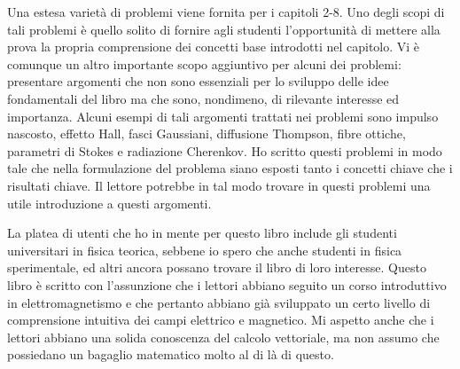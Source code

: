 Una estesa varietà di problemi viene fornita per i capitoli 2-8. Uno degli scopi di tali problemi è quello solito di fornire agli studenti l'opportunità di mettere alla prova la propria comprensione dei concetti base introdotti nel capitolo. Vi è comunque un altro importante scopo aggiuntivo per alcuni dei problemi: presentare argomenti che non sono essenziali per lo sviluppo delle idee fondamentali del libro ma che sono, nondimeno, di rilevante interesse ed importanza. Alcuni esempi di tali argomenti trattati nei problemi sono impulso nascosto, effetto Hall, fasci Gaussiani, diffusione Thompson, fibre ottiche, parametri di Stokes e radiazione Cherenkov. Ho scritto questi problemi in modo tale che nella formulazione del problema siano esposti tanto i concetti chiave che i risultati chiave. Il lettore potrebbe in tal modo trovare in questi problemi una utile introduzione a questi argomenti.

La platea di utenti che ho in mente per questo libro include gli studenti universitari in fisica teorica, sebbene io spero che anche studenti in fisica sperimentale, ed altri ancora possano trovare il libro di loro interesse. Questo libro è scritto con l'assunzione che i lettori abbiano seguito un corso introduttivo in elettromagnetismo e che pertanto abbiano già sviluppato un certo livello di comprensione intuitiva dei campi elettrico e magnetico. Mi aspetto anche che i lettori abbiano una solida conoscenza del calcolo vettoriale, ma non assumo che possiedano un bagaglio matematico molto al di là di questo.


